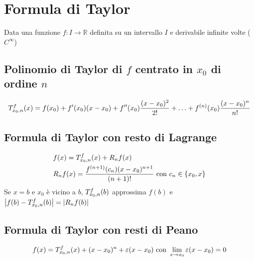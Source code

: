 \documentclass[10pt, a4paper]{article}
\begin{document}
\section{Formula di Taylor}
    Data una funzione $f:I\rightarrow\mathbb{R}$ definita su un intervallo $I$ e derivabile infinite volte ($C^{\infty}$)
    \subsection{Polinomio di Taylor di $f$ centrato in $x_0$ di ordine $n$}
        \begin{equation*}
            \taylor{f}{x_0}{n}(x) = f(x_0)+f'(x_0)(x-x_0)+f''(x_0)\frac{(x-x_0)^2}{2!}+\ldots+f^{(n)}(x_0)\frac{(x-x_0)^n}{n!}
        \end{equation*}
    \subsection{Formula di Taylor con resto di Lagrange}
        \begin{equation*}
            \begin{split}
                &f(x) = \taylor{f}{x_0}{n}(x) + R_nf(x)\\
                &R_nf(x) = \frac{f^{(n+1)}(c_n)(x-x_0)^{n+1}}{(n+1)!} \text{ con } c_n\in\{x_0,x\}
            \end{split}
        \end{equation*}
        Se $x=b$ e $x_0$ è vicino a $b$, $\taylor{f}{x_0}{n}(b)$ approssima $f(b)$ e $\left|f(b)-\taylor{f}{x_0}{n}(b)\right| = \left|R_nf(b)\right|$
    \subsection{Formula di Taylor con resti di Peano}
        \begin{equation*}
                f(x)= \taylor{f}{x_0}{n}(x) + (x-x_0)^n + \varepsilon(x-x_0) \text{ con } \lim_{x\rightarrow x_0} \varepsilon(x-x_0) = 0
        \end{equation*}
\end{document}
